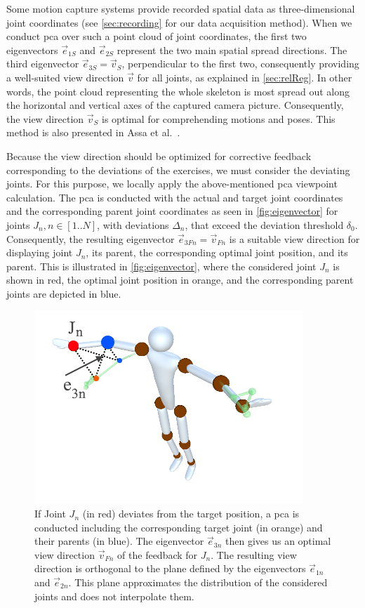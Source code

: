 Some motion capture systems provide recorded spatial data as three-dimensional joint coordinates (see \autoref{sec:recording} for our data acquisition method). When we conduct \acrshort{pca} over such a point cloud of joint coordinates, the first two eigenvectors \(\vec{e}_{1S}\) and \(\vec{e}_{2S}\) represent the two main spatial spread directions. The third eigenvector \(\vec{e}_{3S} = \vec{v}_S\), perpendicular to the first two, consequently providing a well-suited view direction $\vec{v}$ for all joints, as explained in \autoref{sec:relReg}. In other words, the point cloud representing the whole skeleton is most spread out along the horizontal and vertical axes of the captured camera picture. Consequently, the view direction \(\vec{v}_S\) is optimal for comprehending motions and poses. This method is also presented in Assa et al.~\cite{assa2008moh}.

Because the view direction should be optimized for corrective feedback corresponding to the deviations of the exercises, we must consider the deviating joints. For this purpose, we locally apply the above-mentioned \acrshort{pca} viewpoint calculation. The \acrshort{pca} is conducted with the actual and target joint coordinates and the corresponding parent joint coordinates as seen in \autoref{fig:eigenvector} for joints \(J_n, n \in [1..N]\), with deviations \(\Delta_n\), that exceed the deviation threshold \(\delta_0\). Consequently, the resulting eigenvector \(\vec{e}_{3Fn} = \vec{v}_{Fn}\) is a suitable view direction for displaying joint \(J_n\), its parent, the corresponding optimal joint position, and its parent. This is illustrated in \autoref{fig:eigenvector}, where the considered joint \(J_n\) is shown in red, the optimal joint position in orange, and the corresponding parent joints are depicted in blue.

\begin{figure}[tb]
	\centering
	\includegraphics[width=0.5\linewidth]{pictures/eigenvector.png}
	\caption[PCA provides an optimal view direction for feedback.]{If Joint \(J_n\) (in red) deviates from the target position, a \acrshort{pca} is conducted including the corresponding target joint (in orange) and their parents (in blue). The eigenvector \(\vec{e}_{3n}\) then gives us an optimal view direction \(\vec{v}_{Fn}\) of the feedback for \(J_n\). The resulting view direction is orthogonal to the plane defined by the eigenvectors \(\vec{e}_{1n}\) and \(\vec{e}_{2n}\). This plane approximates the distribution of the considered joints and does not interpolate them.}
	\label{fig:eigenvector}
\end{figure}

